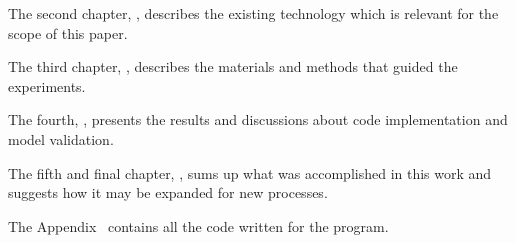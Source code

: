 	The second chapter, \textbf{}, describes the existing technology which is relevant for the scope of this paper.

	The third chapter, \textbf{}, describes the materials and methods that guided the experiments.
	
	The fourth, \textbf{}, presents the results and discussions about code implementation and model validation.
	
	The fifth and final chapter, \textbf{}, sums up what was accomplished in this work and suggests how it may be expanded for new processes.
	
	The Appendix~\textbf{} contains all the code written for the program.